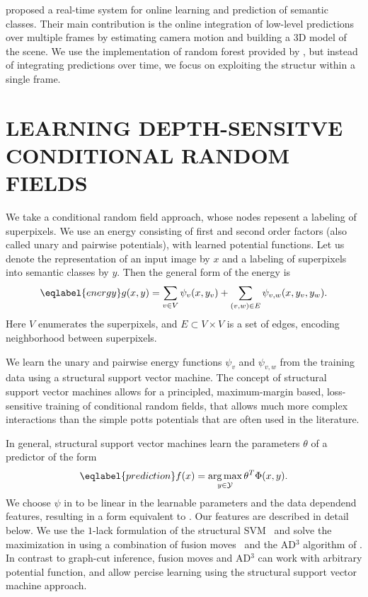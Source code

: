 \documentclass[a4paper, 10pt, conference]{ieeeconf}      %
\DeclareMathOperator*{\argmax}{arg\,max}
\begin{document}
\citet{stueckler2013} proposed a real-time system for online learning and prediction of semantic classes.
Their main contribution is the online integration of low-level predictions over multiple frames
by estimating camera motion and building a 3D model of the scene.
We use the implementation of random forest provided by \citet{stueckler2013}, but instead of
integrating predictions over time, we focus on exploiting the structur within a single frame.

\section{LEARNING DEPTH-SENSITVE CONDITIONAL RANDOM FIELDS}
We take a conditional random field approach, whose nodes repesent a labeling of
superpixels.  We use an energy consisting of first and second order factors
(also called unary and pairwise potentials), with learned potential functions.
Let us denote the representation of an input image by $x$ and a labeling of
superpixels into semantic classes by $y$.  Then the general form of the energy is
\begin{equation}\eqlabel{energy}
    g(x, y) = \sum_{v \in V} \psi_v(x, y_v) + \sum_{(v, w) \in E} \psi_{v,w}(x, y_{v}, y_{w}).
\end{equation}
Here $V$ enumerates the superpixels, and $E\subset V \times V$ is a set of
edges, encoding neighborhood between superpixels.

We learn the unary and pairwise energy functions $\psi_v$ and $\psi_{v, w}$ from the training data
using a structural support vector machine. 
The concept of structural support vector machines allows for a principled,
maximum-margin based, loss-sensitive training of conditional random fields, that allows much
more complex interactions than the simple potts potentials that are often used in the literature.

In general, structural support vector machines learn the parameters $\theta$ of a predictor of the form
\begin{equation}\eqlabel{prediction}
f(x) = \argmax_{y \in \mathcal{Y}} \theta^T \Phi(x, y).
\end{equation}
We choose $\psi$ in  to be linear in the learnable parameters and
the data dependend features, resulting in a form equivalent to
. Our features are described in detail below.  We use the
$1$-lack formulation of the structural SVM~\citep{joachims2009cutting} and
solve the maximization in  using a combination of fusion
moves~\citep{lempitsky2010fusion} and the AD$^3$ algorithm of
\citet{martins2011augmented}.  In contrast to graph-cut inference, fusion moves
and AD$^3$ can work with arbitrary potential function, and allow percise
learning using the structural support vector machine approach.
\end{document}
